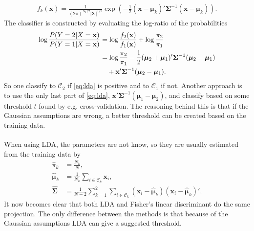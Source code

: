 \documentclass[10pt,a4paper]{article}
\begin{document}
\begin{align}
  f_k(\mathbf{x}) =  \frac{1}{(2\pi)^{N_k/2}|\bm{\Sigma}|^{1/2}} \exp\left( -\frac{1}{2} (\mathbf{x}-\bm \mu_k)' \bm{\Sigma}^{-1} (\mathbf{x}-\bm \mu_k)\right).
\end{align}
The classifier is constructed by evaluating the log-ratio of the probabilities
\begin{align}
  \label{eq:lda} 
  \log{\frac{P(Y=2|X=\mathbf{x})}{P(Y=1|X=\mathbf{x})}} &= \log{\frac{f_2(\mathbf{x})}{f_1(\mathbf{x})} } + \log{\frac{\pi_2}{\pi_1} } \notag \ \\
  &= \log{\frac{\pi_2}{\pi_1}} -\frac{1}{2} (\bm \mu_2+\bm \mu_1)' \bm{\Sigma}^{-1} (\bm \mu_2-\bm \mu_1) \\
  & \quad + \mathbf{x}'\bm{\Sigma}^{-1} (\bm \mu_2-\bm \mu_1).
  \notag \ 
\end{align}
So one classify to $\mathcal{C}_2$ if \eqref{eq:lda} is positive and to $\mathcal{C}_1$ if not. Another approach is to use the only last part of \eqref{eq:lda}, $\mathbf{x}'\bm{\Sigma}^{-1} (\bm \mu_1-\bm \mu_2)$, and classify based on some threshold $t$ found by e.g. cross-validation. The reasoning behind this is that if the Gaussian assumptions are wrong, a better threshold can be created based on the training data. \\
\\
When using LDA, the parameters are not know, so they are usually estimated from the training data by
\begin{align}
   \hat{\pi}_k &= \frac{N_k}{N},  \\
   \hat{\bm \mu}_k &= \frac{1}{N_k} \sum_{i \in \mathcal{C}_k}\mathbf{x}_i, \\
   \hat{\bm \Sigma} &= \frac{1}{N-2} \sum_{k = 1}^{2} \sum_{i \in \mathcal{C}_k}(\mathbf{x}_i - \hat{\bm{\mu}}_k)(\mathbf{x}_i - \hat{\bm{\mu}}_k)'.
\end{align}
It now becomes clear that both LDA and Fisher's linear discriminant do the same projection. The only difference between the methods is that because of the Gaussian assumptions LDA can give a suggested threshold.
%
\end{document}
